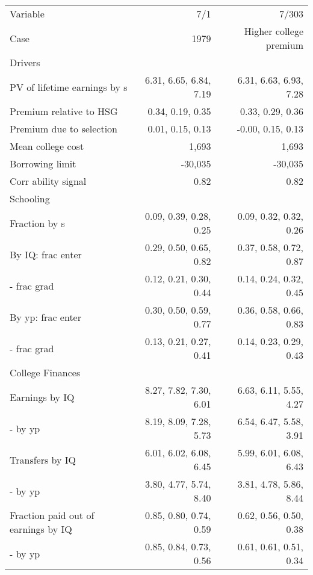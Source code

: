\begin{tabular}{lrr}
\hline
Variable & 7/1  & 7/303  \\ 
Case & 1979  & Higher college premium  \\ 
Drivers &   &   \\ 
PV of lifetime earnings by s & 6.31, 6.65, 6.84, 7.19  & 6.31, 6.63, 6.93, 7.28  \\ 
Premium relative to HSG & 0.34, 0.19, 0.35  & 0.33, 0.29, 0.36  \\ 
Premium due to selection & 0.01, 0.15, 0.13  & -0.00, 0.15, 0.13  \\ 
Mean college cost & 1,693  & 1,693  \\ 
Borrowing limit & -30,035  & -30,035  \\ 
Corr ability signal & 0.82  & 0.82  \\ 
\hline
Schooling &   &   \\ 
Fraction by s & 0.09, 0.39, 0.28, 0.25  & 0.09, 0.32, 0.32, 0.26  \\ 
By IQ: frac enter & 0.29, 0.50, 0.65, 0.82  & 0.37, 0.58, 0.72, 0.87  \\ 
- frac grad & 0.12, 0.21, 0.30, 0.44  & 0.14, 0.24, 0.32, 0.45  \\ 
By yp: frac enter & 0.30, 0.50, 0.59, 0.77  & 0.36, 0.58, 0.66, 0.83  \\ 
- frac grad & 0.13, 0.21, 0.27, 0.41  & 0.14, 0.23, 0.29, 0.43  \\ 
\hline
College Finances &   &   \\ 
Earnings by IQ & 8.27, 7.82, 7.30, 6.01  & 6.63, 6.11, 5.55, 4.27  \\ 
- by yp & 8.19, 8.09, 7.28, 5.73  & 6.54, 6.47, 5.58, 3.91  \\ 
Transfers by IQ & 6.01, 6.02, 6.08, 6.45  & 5.99, 6.01, 6.08, 6.43  \\ 
- by yp & 3.80, 4.77, 5.74, 8.40  & 3.81, 4.78, 5.86, 8.44  \\ 
Fraction paid out of earnings by IQ & 0.85, 0.80, 0.74, 0.59  & 0.62, 0.56, 0.50, 0.38  \\ 
- by yp & 0.85, 0.84, 0.73, 0.56  & 0.61, 0.61, 0.51, 0.34  \\ 
\hline
\end{tabular}%
